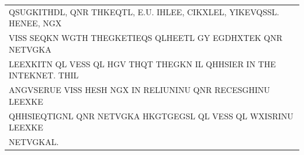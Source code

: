 \documentclass[aspectratio=169, lualatex, 10pt,dvipsnames,svgnames]{beamer} %
\def\enbleu#1{\textcolor{bleu}{#1}}
\begin{document}
\begin{frame}
{\begin{tabular}[t]{l}
      QSUGK\enbleu{I}\enbleu{T}\enbleu{H}DL, Q\enbleu{N}R \enbleu{T}\enbleu{H}K\enbleu{E}Q\enbleu{T}L, \enbleu{E}.U. \enbleu{I}HL\enbleu{E}E, C\enbleu{I}KXL\enbleu{E}L, Y\enbleu{I}K\enbleu{E}VQSSL. \enbleu{H}\enbleu{E}\enbleu{N}E\enbleu{E}, NGX \\
      V\enbleu{I}SS S\enbleu{E}QK\enbleu{N} WG\enbleu{T}\enbleu{H} \enbleu{T}\enbleu{H}\enbleu{E}GK\enbleu{E}\enbleu{T}\enbleu{I}EQS QLH\enbleu{E}E\enbleu{T}L GY EGDHX\enbleu{T}\enbleu{E}K Q\enbleu{N}R \enbleu{N}\enbleu{E}\enbleu{T}VGKA \\
      L\enbleu{E}EXK\enbleu{I}\enbleu{T}N QL V\enbleu{E}SS QL \enbleu{H}GV \enbleu{T}\enbleu{H}Q\enbleu{T} \enbleu{T}\enbleu{H}\enbleu{E}GKN \enbleu{I}L QHHS\enbleu{I}\enbleu{E}R \enbleu{I}\enbleu{N} \enbleu{T}\enbleu{H}\enbleu{E} \enbleu{I}\enbleu{N}\enbleu{T}\enbleu{E}K\enbleu{N}\enbleu{E}\enbleu{T}. \enbleu{T}\enbleu{H}\enbleu{I}L \\
      A\enbleu{N}GVS\enbleu{E}RU\enbleu{E} V\enbleu{I}SS \enbleu{H}\enbleu{E}SH NGX \enbleu{I}\enbleu{N} R\enbleu{E}L\enbleu{I}U\enbleu{N}\enbleu{I}\enbleu{N}U Q\enbleu{N}R R\enbleu{E}C\enbleu{E}SGH\enbleu{I}\enbleu{N}U L\enbleu{E}EXK\enbleu{E} \\
      QHHS\enbleu{I}EQ\enbleu{T}\enbleu{I}G\enbleu{N}L Q\enbleu{N}R \enbleu{N}\enbleu{E}\enbleu{T}VGKA HKG\enbleu{T}GEGSL QL V\enbleu{E}SS QL WX\enbleu{I}SR\enbleu{I}\enbleu{N}U L\enbleu{E}EXK\enbleu{E} \\
      \enbleu{N}\enbleu{E}\enbleu{T}VGKAL.
    \end{tabular}
  }
  \vspace{0.5cm}

  \normalsize
  \color{black}{Most common digrams in c: of $>$ zi $>$ \dots}
  
  \color{black}
\end{frame}
\end{document}
